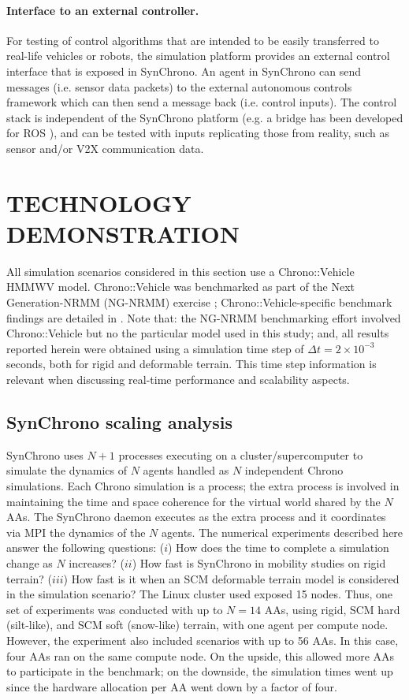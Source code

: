 \documentclass[12pt,twocolumn]{article}
\begin{document}
\paragraph{Interface to an external controller.} For testing of control algorithms that are intended to be easily transferred to real-life vehicles or robots, the simulation platform provides an external control interface that is exposed in SynChrono. An agent in SynChrono can send messages (i.e. sensor data packets) to the external autonomous controls framework which can then send a message back (i.e. control inputs). The control stack is independent of the SynChrono platform (e.g. a bridge has been developed for ROS \cite{ROS-2009}), and can be tested with inputs replicating those from reality, such as sensor and/or V2X communication data.

\section{TECHNOLOGY DEMONSTRATION}
\label{sec:demoTechnology}
All simulation scenarios considered in this section use a Chrono::Vehicle HMMWV model. Chrono::Vehicle was benchmarked as part of the Next Generation-NRMM (NG-NRMM) exercise \cite{NATObenchmark2018}; Chrono::Vehicle-specific benchmark findings are detailed in \cite{TR2017-05NRMM-wheeled,TR2016-08NRMM-tracked}. Note that: the NG-NRMM benchmarking effort involved Chrono::Vehicle but no the particular model used in this study; and, all results reported herein were obtained using a simulation time step of $\Delta t=2 \times 10^{-3}$ seconds, both for rigid and deformable terrain. This time step information is relevant when discussing real-time performance and scalability aspects.

\subsection{SynChrono scaling analysis}\label{sec:syn-scaling-analysis} 
SynChrono uses $N+1$ processes executing on a cluster/supercomputer to simulate the dynamics of $N$ agents handled as $N$ independent Chrono simulations. Each Chrono simulation is a process; the extra process is involved in maintaining the time and space coherence for the virtual world shared by the $N$ AAs. The SynChrono daemon executes as the extra process and it coordinates via MPI the dynamics of the $N$ agents. The numerical experiments described here answer the following questions: ($i$) How does the time to complete a simulation change as $N$ increases? ($ii$) How fast is SynChrono in mobility studies on rigid terrain? ($iii$) How fast is it when an SCM deformable terrain model is considered in the simulation scenario? The Linux cluster used exposed 15 nodes. Thus, one set of experiments was conducted with up to $N=14$ AAs, using rigid, SCM hard (silt-like), and SCM soft (snow-like) terrain, with one agent per compute node. However, the experiment also included scenarios with up to 56 AAs. In this case, four AAs ran on the same compute node. On the upside, this allowed more AAs to participate in the benchmark; on the downside, the simulation times went up since the hardware allocation per AA went down by a factor of four.
\end{document}
